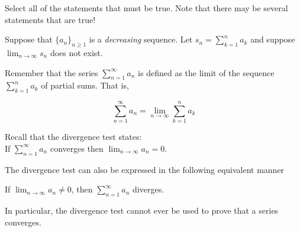 \documentclass{ximera}
\author{Jim Talamo and Jason Miller}
\begin{document}
\begin{exercise}

Select all of the statements that must be true.  Note that there may be several statements that are true! 

 Suppose that $\displaystyle\{a_n\}_{n \geq 1}$ is a \emph{decreasing} sequence.  Let $s_n =\displaystyle  \sum^n_{k=1} a_k$ and suppose $\displaystyle \lim_{n \rightarrow \infty} s_n$ does  not exist.


\begin{selectAll}
\end{selectAll}

\begin{hint}
Remember that the series $\sum^{\infty}_{n=1} a_n$ is defined as the limit of the sequence $\sum^{n}_{k=1} a_k$ of partial sums. That is, 

\[
\sum^{\infty}_{n=1} a_n = \lim_{n \to \infty} \sum^n_{k=1} a_k
\]
\end{hint}


\begin{hint}
Recall that the divergence test states: \\
If $\sum^{\infty}_{n=1} a_n $ converges then $\lim_{n \to \infty} a_n=0$. 

The divergence test can also be expressed in the following equivalent manner

If $\lim_{n \to \infty} a_n \neq 0$, then $\sum^{\infty}_{n=1} a_n$ diverges. 

In particular, the divergence test cannot ever be used to prove that a series converges.
\end{hint}





\end{exercise}
\end{document}
